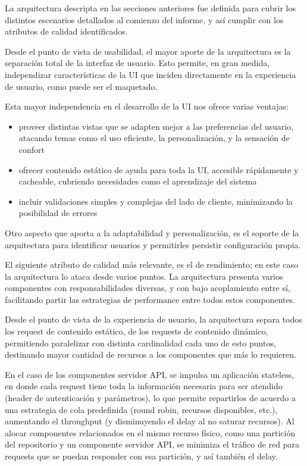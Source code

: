 La arquitectura descripta en las secciones anteriores fue definida para cubrir los distintos escenarios detallados al comienzo del informe, y as\'i cumplir con los atributos de calidad identificados.

Desde el punto de vista de usabilidad, el mayor aporte de la arquitectura es la separaci\'on total de la interfaz de usuario. Esto permite, en gran medida, independizar caracter\'isticas de la UI que inciden directamente en la experiencia de usuario, como puede ser el maquetado.

Esta mayor independencia en el desarrollo de la UI nos ofrece varias ventajas:

\begin{itemize}
\item proveer distintas vistas que se adapten mejor a las preferencias del usuario, atacando temas como el uso eficiente, la personalizaci\'on, y la sensaci\'on de confort
\item ofrecer contenido est\'atico de ayuda para toda la UI, accesible r\'apidamente y cacheable, cubriendo necesidades como el aprendizaje del sistema
\item incluir validaciones simples y complejas del lado de cliente, minimizando la posibilidad de errores
\end{itemize}

Otro aspecto que aporta a la adaptabilidad y personalizaci\'on, es el soporte de la arquitectura para identificar usuarios y permitirles persistir configuraci\'on propia.

El siguiente atributo de calidad m\'as relevante, es el de rendimiento; en este caso la arquitectura lo ataca desde varios puntos. La arquitectura presenta varios componentes con responsabilidades diversas, y con bajo acoplamiento entre s\'i, facilitando partir las estrategias de performance entre todos estos componentes.

Desde el punto de vista de la experiencia de usuario, la arquitectura separa todos los request de contenido est\'atico, de los requests de contenido din\'amico, permitiendo paralelizar con distinta cardinalidad cada uno de esto puntos, destinando mayor cantidad de recursos a los componentes que m\'as lo requieren. 

En el caso de los componentes servidor API, se impulsa un aplicaci\'on stateless, en donde cada request tiene toda la informaci\'on necesaria para ser atendido (header de autenticaci\'on y par\'ametros), lo que permite repartirlos de acuerdo a una estrategia de cola predefinida (round robin, recursos disponibles, etc.), aumentando el throughput (y disminuyendo el delay al no saturar recursos). Al alocar componentes relacionados en el mismo recurso f\'isico, como una partici\'on del repositorio y un componente servidor API, se minimiza el tr\'afico de red para requests que se puedan responder con esa partici\'on, y as\'i tambi\'en el delay.

